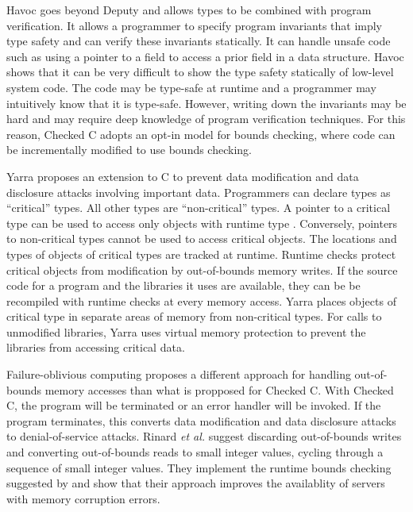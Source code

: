 Havoc \cite{Condit2009} goes beyond Deputy and allows types to be combined with program
verification. It allows a programmer to specify program invariants that
imply type safety and can verify these invariants statically. It can
handle unsafe code such as using a pointer to a field to access a prior
field in a data structure.    Havoc shows that it can be very difficult
to show the type safety statically of  low-level system code. 
The code may be type-safe at runtime and a programmer may intuitively know that it is type-safe.  However, writing down the invariants may be hard and may require deep
knowledge of program verification techniques. For this reason,
Checked C adopts an opt-in model for bounds checking, where code
can be incrementally modified to use bounds checking.

Yarra \cite{Schlesinger2011} proposes an extension to C to prevent data
modification and data disclosure attacks involving important data. 
Programmers can declare types as ``critical'' types.  All other types
are ``non-critical'' types.  A pointer to a critical type  can 
be used to access only objects with runtime type .   Conversely, pointers
to non-critical types cannot be used to access critical objects. 
The locations and types of objects of critical types are 
tracked at runtime.  Runtime checks protect critical objects from modification
by out-of-bounds memory writes.  If the source code for a program and the libraries
it uses are available, they can be be recompiled with runtime checks at every memory
access.  Yarra places objects of critical type in separate areas of memory from
non-critical types. For calls to unmodified libraries, Yarra uses virtual memory
protection to prevent the libraries from accessing critical data.

Failure-oblivious computing \cite{Rinard2004} proposes a different approach for
handling out-of-bounds memory accesses than what is propposed for Checked C.  
With Checked C,
the program will be terminated or an error handler will be invoked.  If the
program terminates, this converts data modification and data disclosure attacks to denial-of-service attacks.  Rinard {\it et al.} suggest discarding out-of-bounds
writes and converting out-of-bounds reads to small integer values, cycling
through a sequence of small integer values.   They implement the runtime
bounds checking suggested by \cite{Ruwase2004} and show that their approach
improves the availablity of servers with memory corruption errors.
